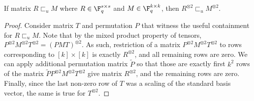 \documentclass[11pt]{article}
\newcommand{\usef}{\sqsubset_u}
\begin{document}
\begin{lemma}
	\label{lem:useful-square}
	If matrix $R \usef M$ where $R\in \F_q^{s\times s}$ and $M \in \F_q^{k \times k}$, then $R^{\otimes 2} \usef M^{\otimes 2}$.
\end{lemma}
\begin{proof}
	Consider matrix $T$ and permutation $P$ that witness the useful containment for $R\usef M$. Note that by the mixed product property of tensors, $P^{\otimes 2}M^{\otimes 2} T^{\otimes 2} = (PMT)^{\otimes 2}$. 
	As such, restriction of a matrix $P^{\otimes 2} M^{\otimes 2} T^{\otimes 2}$ to rows corresponding to $[k]\times [k]$ is exactly $R^{\otimes 2}$, and all remaining rows are zero. We can apply additional permutation matrix $\tilde{P}$ so that those are exactly first $k^2$ rows of the matrix $\tilde{P} P^{\otimes 2} M^{\otimes 2} T^{\otimes 2}$ give matrix $R^{\otimes 2}$, and the remaining rows are zero.  Finally, since the last non-zero row of $T$ was a scaling of the standard basis vector, the same is true for $T^{\otimes 2}$.
\end{proof}
\end{document}
